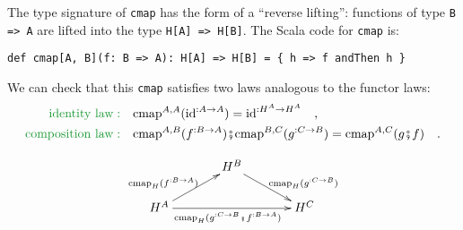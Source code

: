 The type signature of \lstinline!cmap! has the form of a \textsf{``}reverse
lifting\textsf{''}: functions of type \lstinline!B => A! are lifted into
the type \lstinline!H[A] => H[B]!. The Scala code for \lstinline!cmap!
is:
\begin{lstlisting}
def cmap[A, B](f: B => A): H[A] => H[B] = { h => f andThen h } 
\end{lstlisting}
We can check that this \lstinline!cmap! satisfies two laws analogous
to the functor laws:
\begin{align*}
{\color{greenunder}\text{identity law}:}\quad & \text{cmap}^{A,A}(\text{id}^{:A\rightarrow A})=\text{id}^{:H^{A}\rightarrow H^{A}}\quad,\\
{\color{greenunder}\text{composition law}:}\quad & \text{cmap}^{A,B}(f^{:B\rightarrow A})\bef\text{cmap}^{B,C}(g^{:C\rightarrow B})=\text{cmap}^{A,C}(g\bef f)\quad.
\end{align*}

\begin{wrapfigure}{l}{0.4\columnwidth}%
\vspace{-2\baselineskip}
\[
\xymatrix{\xyScaleY{1.5pc}\xyScaleX{3pc} & H^{B}\ar[rd]\sp(0.6){\ ~\text{cmap}_{H}(g^{:C\rightarrow B})}\\
H^{A}\ar[ru]\sp(0.4){\text{cmap}_{H}(f^{:B\rightarrow A})\ }\ar[rr]\sb(0.5){\text{cmap}_{H}(g^{:C\rightarrow B}\bef f^{:B\rightarrow A})\ ~} &  & H^{C}
}
\]

\vspace{-2\baselineskip}
\end{wrapfigure}%

